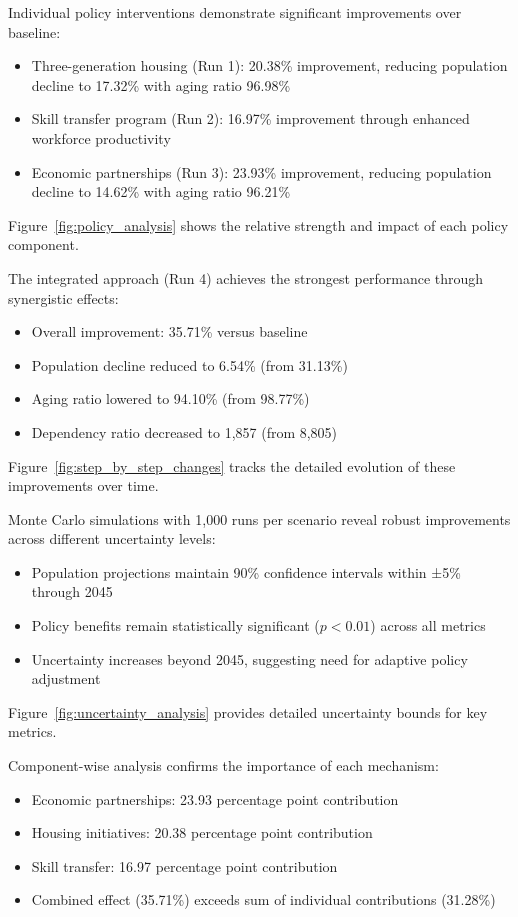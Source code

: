 \documentclass{article} %
\begin{document}
Individual policy interventions demonstrate significant improvements over baseline:
\begin{itemize}
    \item Three-generation housing (Run 1): 20.38\% improvement, reducing population decline to 17.32\% with aging ratio 96.98\%
    \item Skill transfer program (Run 2): 16.97\% improvement through enhanced workforce productivity
    \item Economic partnerships (Run 3): 23.93\% improvement, reducing population decline to 14.62\% with aging ratio 96.21\%
\end{itemize}
Figure~\ref{fig:policy_analysis} shows the relative strength and impact of each policy component.

The integrated approach (Run 4) achieves the strongest performance through synergistic effects:
\begin{itemize}
    \item Overall improvement: 35.71\% versus baseline
    \item Population decline reduced to 6.54\% (from 31.13\%)
    \item Aging ratio lowered to 94.10\% (from 98.77\%)
    \item Dependency ratio decreased to 1,857 (from 8,805)
\end{itemize}
Figure~\ref{fig:step_by_step_changes} tracks the detailed evolution of these improvements over time.

Monte Carlo simulations with 1,000 runs per scenario reveal robust improvements across different uncertainty levels:
\begin{itemize}
    \item Population projections maintain 90\% confidence intervals within ±5\% through 2045
    \item Policy benefits remain statistically significant ($p < 0.01$) across all metrics
    \item Uncertainty increases beyond 2045, suggesting need for adaptive policy adjustment
\end{itemize}
Figure~\ref{fig:uncertainty_analysis} provides detailed uncertainty bounds for key metrics.

Component-wise analysis confirms the importance of each mechanism:
\begin{itemize}
    \item Economic partnerships: 23.93 percentage point contribution
    \item Housing initiatives: 20.38 percentage point contribution
    \item Skill transfer: 16.97 percentage point contribution
    \item Combined effect (35.71\%) exceeds sum of individual contributions (31.28\%)
\end{itemize}
\end{document}
